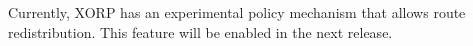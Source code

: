Currently, XORP has an experimental policy mechanism that allows
route redistribution. This feature will be enabled in the next release.



